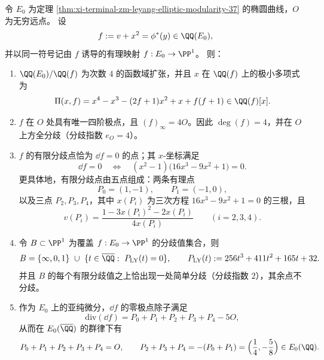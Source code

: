 \begin{proposition}\label{prop:xi-terminal-zm-leyang-f-ramification}
令 \(E_0\) 为定理 \ref{thm:xi-terminal-zm-leyang-elliptic-modularity-37} 的椭圆曲线，\(O\) 为无穷远点。
设
\[
f:=v+x^{2}=\phi^{*}(y)\in\QQ(E_0),
\]
并以同一符号记由 \(f\) 诱导的有理映射 \(f:E_0\to\PP^{1}\)。
则：
\begin{enumerate}
  \item \(\QQ(E_0)/\QQ(f)\) 为次数 \(4\) 的函数域扩张，并且 \(x\) 在 \(\QQ(f)\) 上的极小多项式为
  \[
  \Pi(x,f)=x^{4}-x^{3}-(2f+1)x^{2}+x+f(f+1)\in\QQ(f)[x].
  \]
  \item \(f\) 在 \(O\) 处具有唯一四阶极点，且 \((f)_\infty=4O\)。因此 \(\deg(f)=4\)，并在 \(O\) 上方全分歧（分歧指数 \(e_O=4\)）。
  \item \(f\) 的有限分歧点恰为 \(\dd f=0\) 的点；其 \(x\)-坐标满足
  \[
  \dd f=0\quad\Longleftrightarrow\quad (x^{2}-1)\bigl(16x^{3}-9x^{2}+1\bigr)=0.
  \]
  更具体地，有限分歧点由五点组成：两条有理点
  \[
  P_0=(1,-1),\qquad P_1=(-1,0),
  \]
  以及三点 \(P_2,P_3,P_4\)，其中 \(x(P_i)\) 为三次方程 \(16x^{3}-9x^{2}+1=0\) 的三根，且
  \[
  v(P_i)=\frac{1-3x(P_i)^2-2x(P_i)}{4x(P_i)}\qquad(i=2,3,4).
  \]
  \item 令 \(B\subset\PP^1\) 为覆盖 \(f:E_0\to\PP^1\) 的分歧值集合，则
  \[
  B=\{\infty,0,1\}\ \cup\ \{t\in\overline{\QQ}:\ P_{\mathrm{LY}}(t)=0\},
  \qquad
  P_{\mathrm{LY}}(t):=256t^3+411t^2+165t+32.
  \]
  并且 \(B\) 的每个有限分歧值之上恰出现一处简单分歧（分歧指数 \(2\)），其余点不分歧。
  \item 作为 \(E_0\) 上的亚纯微分，\(\dd f\) 的零极点除子满足
  \[
  \mathrm{div}(\dd f)=P_0+P_1+P_2+P_3+P_4-5O,
  \]
  从而在 \(E_0(\overline{\QQ})\) 的群律下有
  \[
  P_0+P_1+P_2+P_3+P_4=O,
  \qquad
  P_2+P_3+P_4=-(P_0+P_1)=\Bigl(\frac14,-\frac58\Bigr)\in E_0(\QQ).
  \]
\end{enumerate}
\end{proposition}

